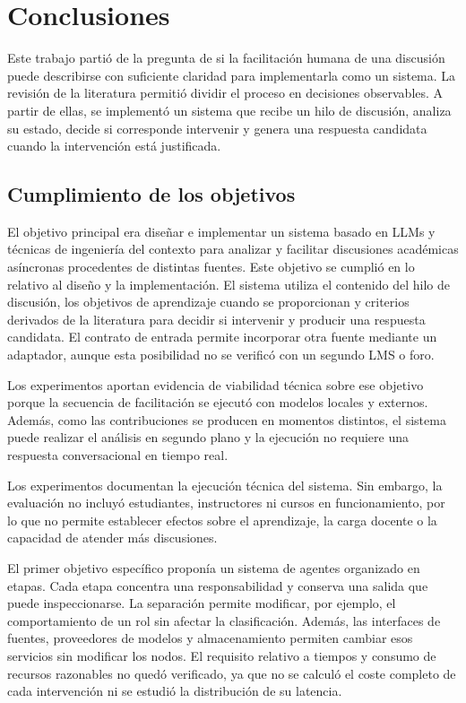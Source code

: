 \chapter{Conclusiones}
\label{chap:conclusiones}

Este trabajo partió de la pregunta de si la facilitación humana de una discusión puede describirse con suficiente claridad para implementarla como un sistema. La revisión de la literatura permitió dividir el proceso en decisiones observables. A partir de ellas, se implementó un sistema que recibe un hilo de discusión, analiza su estado, decide si corresponde intervenir y genera una respuesta candidata cuando la intervención está justificada.

\section{Cumplimiento de los objetivos}

El objetivo principal era diseñar e implementar un sistema basado en LLMs y técnicas de ingeniería del contexto para analizar y facilitar discusiones académicas asíncronas procedentes de distintas fuentes. Este objetivo se cumplió en lo relativo al diseño y la implementación. El sistema utiliza el contenido del hilo de discusión, los objetivos de aprendizaje cuando se proporcionan y criterios derivados de la literatura para decidir si intervenir y producir una respuesta candidata. El contrato de entrada permite incorporar otra fuente mediante un adaptador, aunque esta posibilidad no se verificó con un segundo LMS o foro.

Los experimentos aportan evidencia de viabilidad técnica sobre ese objetivo porque la secuencia de facilitación se ejecutó con modelos locales y externos. Además, como las contribuciones se producen en momentos distintos, el sistema puede realizar el análisis en segundo plano y la ejecución no requiere una respuesta conversacional en tiempo real.

Los experimentos documentan la ejecución técnica del sistema. Sin embargo, la evaluación no incluyó estudiantes, instructores ni cursos en funcionamiento, por lo que no permite establecer efectos sobre el aprendizaje, la carga docente o la capacidad de atender más discusiones.

El primer objetivo específico proponía un sistema de agentes organizado en etapas. Cada etapa concentra una responsabilidad y conserva una salida que puede inspeccionarse. La separación permite modificar, por ejemplo, el comportamiento de un rol sin afectar la clasificación. Además, las interfaces de fuentes, proveedores de modelos y almacenamiento permiten cambiar esos servicios sin modificar los nodos. El requisito relativo a tiempos y consumo de recursos razonables no quedó verificado, ya que no se calculó el coste completo de cada intervención ni se estudió la distribución de su latencia.

